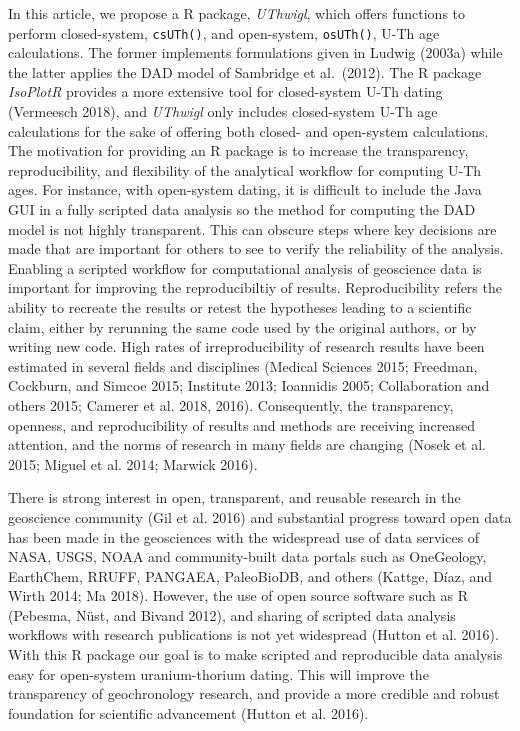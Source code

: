 \documentclass[]{elsarticle} %
\begin{document}
In this article, we propose a R package, \emph{UThwigl}, which offers functions to perform closed-system, \texttt{csUTh()}, and open-system, \texttt{osUTh()}, U-Th age calculations. The former implements formulations given in Ludwig (2003a) while the latter applies the DAD model of Sambridge et al.~(2012). The R package \emph{IsoPlotR} provides a more extensive tool for closed-system U-Th dating (Vermeesch 2018), and \emph{UThwigl} only includes closed-system U-Th age calculations for the sake of offering both closed- and open-system calculations.\\
The motivation for providing an R package is to increase the transparency, reproducibility, and flexibility of the analytical workflow for computing U-Th ages. For instance, with open-system dating, it is difficult to include the Java GUI in a fully scripted data analysis so the method for computing the DAD model is not highly transparent. This can obscure steps where key decisions are made that are important for others to see to verify the reliability of the analysis. Enabling a scripted workflow for computational analysis of geoscience data is important for improving the reproducibiltiy of results. Reproducibility refers the ability to recreate the results or retest the hypotheses leading to a scientific claim, either by rerunning the same code used by the original authors, or by writing new code. High rates of irreproducibility of research results have been estimated in several fields and disciplines (Medical Sciences 2015; Freedman, Cockburn, and Simcoe 2015; Institute 2013; Ioannidis 2005; Collaboration and others 2015; Camerer et al. 2018, 2016). Consequently, the transparency, openness, and reproducibility of results and methods are receiving increased attention, and the norms of research in many fields are changing (Nosek et al. 2015; Miguel et al. 2014; Marwick 2016).

There is strong interest in open, transparent, and reusable research in the geoscience community (Gil et al. 2016) and substantial progress toward open data has been made in the geosciences with the widespread use of data services of NASA, USGS, NOAA and community-built data portals such as OneGeology, EarthChem, RRUFF, PANGAEA, PaleoBioDB, and others (Kattge, Díaz, and Wirth 2014; Ma 2018). However, the use of open source software such as R (Pebesma, Nüst, and Bivand 2012), and sharing of scripted data analysis workflows with research publications is not yet widespread (Hutton et al. 2016). With this R package our goal is to make scripted and reproducible data analysis easy for open-system uranium-thorium dating. This will improve the transparency of geochronology research, and provide a more credible and robust foundation for scientific advancement (Hutton et al. 2016).
\end{document}
